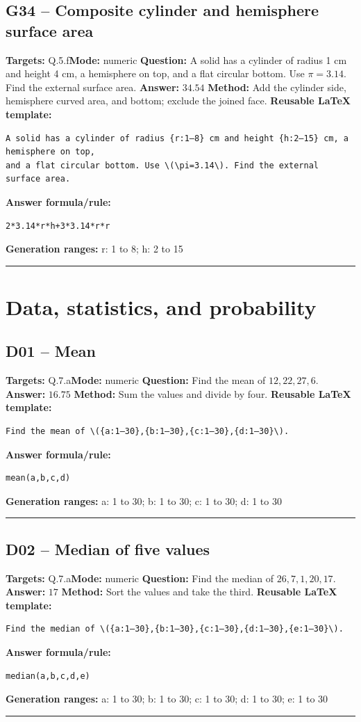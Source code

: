 \documentclass[11pt]{article}
\begin{document}
\subsection{G34 -- Composite cylinder and hemisphere surface area}
\textbf{Targets:} Q.5.f\quad\textbf{Mode:} numeric
\textbf{Question:} A solid has a cylinder of radius 1 cm and height 4 cm, a hemisphere on top, and a flat circular bottom. Use \(\pi=3.14\). Find the external surface area.
\textbf{Answer:} \(34.54\)
\textbf{Method:} Add the cylinder side, hemisphere curved area, and bottom; exclude the joined face.
\textbf{Reusable LaTeX template:}
\begin{verbatim}
A solid has a cylinder of radius {r:1–8} cm and height {h:2–15} cm, a hemisphere on top,
and a flat circular bottom. Use \(\pi=3.14\). Find the external surface area.
\end{verbatim}
\textbf{Answer formula/rule:}
\begin{verbatim}
2*3.14*r*h+3*3.14*r*r
\end{verbatim}
\textbf{Generation ranges:} r: 1 to 8; h: 2 to 15
\medskip\hrule\medskip
\section{Data, statistics, and probability}
\subsection{D01 -- Mean}
\textbf{Targets:} Q.7.a\quad\textbf{Mode:} numeric
\textbf{Question:} Find the mean of \(12,22,27,6\).
\textbf{Answer:} \(16.75\)
\textbf{Method:} Sum the values and divide by four.
\textbf{Reusable LaTeX template:}
\begin{verbatim}
Find the mean of \({a:1–30},{b:1–30},{c:1–30},{d:1–30}\).
\end{verbatim}
\textbf{Answer formula/rule:}
\begin{verbatim}
mean(a,b,c,d)
\end{verbatim}
\textbf{Generation ranges:} a: 1 to 30; b: 1 to 30; c: 1 to 30; d: 1 to 30
\medskip\hrule\medskip
\subsection{D02 -- Median of five values}
\textbf{Targets:} Q.7.a\quad\textbf{Mode:} numeric
\textbf{Question:} Find the median of \(26,7,1,20,17\).
\textbf{Answer:} \(17\)
\textbf{Method:} Sort the values and take the third.
\textbf{Reusable LaTeX template:}
\begin{verbatim}
Find the median of \({a:1–30},{b:1–30},{c:1–30},{d:1–30},{e:1–30}\).
\end{verbatim}
\textbf{Answer formula/rule:}
\begin{verbatim}
median(a,b,c,d,e)
\end{verbatim}
\textbf{Generation ranges:} a: 1 to 30; b: 1 to 30; c: 1 to 30; d: 1 to 30; e: 1 to 30
\medskip\hrule\medskip
\end{document}
